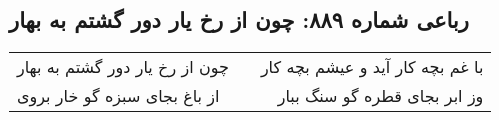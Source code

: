 \begin{center}
\section*{رباعی شماره ۸۸۹: چون از رخ یار دور گشتم به بهار}
\label{sec:0889}
\begin{longtable}{l p{0.5cm} r}
چون از رخ یار دور گشتم به بهار
&&
با غم بچه کار آید و عیشم بچه کار
\\
از باغ بجای سبزه گو خار بروی
&&
وز ابر بجای قطره گو سنگ ببار
\\
\end{longtable}
\end{center}
